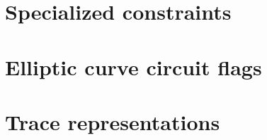 \section{Specialized constraints}                                           \label{bls: specialized constraints}                                 
       
\section{Elliptic curve circuit flags}                                      \label{bls: circuits}                                                
     
\newpage     
\section{Trace representations}                                             \label{bls: trace representations}                                   